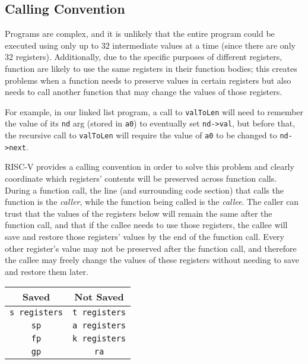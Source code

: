 \documentclass{article}
\begin{document}
\subsection{Calling Convention}
Programs are complex, and it is unlikely that the entire program could be executed using only up to 32 intermediate values at a time (since there are only 32 registers). Additionally, due to the specific purposes of different registers, function are likely to use the same registers in their function bodies; this creates problems when a function needs to preserve values in certain registers but also needs to call another function that may change the values of those registers. 

For example, in our linked list program, a call to \texttt{valToLen} will need to remember the value of its \texttt{nd} arg (stored in \texttt{a0}) to eventually set \texttt{nd->val}, but before that, the recursive call to \texttt{valToLen} will require the value of \texttt{a0} to be changed to \texttt{nd->next}.

RISC-V provides a calling convention in order to solve this problem and clearly coordinate which registers' contents will be preserved across function calls. During a function call, the line (and surrounding code section) that calls the function is the \textit{caller}, while the function being called is the \textit{callee}. The caller can trust that the values of the registers below will remain the same after the function call, and that if the callee needs to use those registers, the callee will save and restore those registers' values by the end of the function call. Every other register's value may not be preserved after the function call, and therefore the callee may freely change the values of these registers without needing to save and restore them later.
\begin{center}
 \begin{tabular}{||c c||} 
 \hline
 \textbf{Saved} & \textbf{Not Saved}\\
 \hline
 \texttt{s registers} & \texttt{t registers}\\ 
 \texttt{sp} & \texttt{a registers} \\
 \texttt{fp} &  \texttt{k registers}\\ 
 \texttt{gp} &  \texttt{ra}\\
 \hline
\end{tabular}
\end{center}
\end{document}
